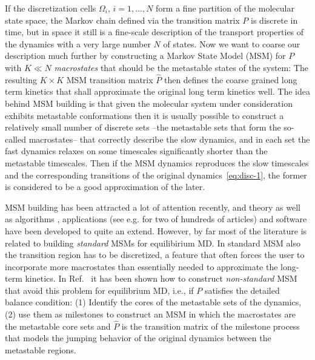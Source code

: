 \documentclass[aps, pre, preprint,unsortedaddress,a4paper,onecolumn]{revtex4}
\newcommand{\vect}[1]{#1}
\begin{document}
If the discretization cells $\Omega_i$, $i=1,\ldots,N$ form a fine
partition of the molecular state space, the Markov chain defined via
the transition matrix $P$
 is discrete in time, but in space it still is a fine-scale description of the transport properties of the
dynamics with a very large number $N$ of states.  Now we want to coarse our description much further by
constructing a Markov State Model (MSM) for $\vect P$ with $K\ll N$
\emph{macrostates} that should be the metastable states of the system: The resulting $K\times K$ MSM transition matrix $\hat{\vect P}$
then defines the coarse grained long term kinetics that shall
approximate the original long term kinetics well. 
The idea behind MSM building is that given the molecular system under consideration exhibits metastable conformations then it is usually possible to construct a
relatively small number of discrete sets --the metastable sets that form the so-called macrostates-- that
correctly describe the slow  dynamics, and 
in each set the fast dynamics relaxes on some timescales significantly shorter than the metastable timescales.
Then if the MSM dynamics reproduces the slow timescales and the corresponding transitions
of the original dynamics~\eqref{eq:disc-1},
the former is considered to be a good approximation of the later.

MSM building has been attracted a lot of attention recently, and theory  \cite{A19-31} as well as algorithms \cite{A19-1}, applications (see e.g. \cite{A19-26,PNAS09} for two of hundreds of articles) and software \cite{A19-49, MSMBuilder} have been developed to quite an extend. However, 
by far most of the literature is related to building \emph{standard} MSMs for equilibirium MD. In standard MSM also the transition region has to be discretized, a feature that often forces the user to incorporate more macrostates than essentially needed to approximate the long-term kinetics.
In Ref.~\cite{sarich2010approximation, A19-31,schuette2011markov,BucheteHummer} it has been shown how to construct \emph{non-standard} MSM that avoid this problem for equilibrium MD, i.e., if $\vect P$ satisfies the detailed balance
condition: (1) Identify the cores of the metastable sets of the
dynamics, (2) use them as milestones to construct an MSM in which the
macrostates are the metastable core sets and $\hat{\vect P}$ is the transition
matrix of the milestone process \cite{A19-31,schuette2011markov,A19-29} that models the jumping behavior of
the original dynamics between the metastable regions. 
\end{document}
